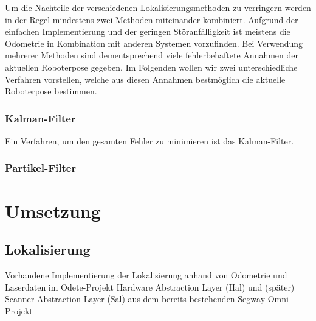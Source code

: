 Um die Nachteile der verschiedenen Lokalisierungsmethoden zu
 verringern werden in der Regel mindestens zwei Methoden miteinander
 kombiniert. Aufgrund der einfachen Implementierung und der geringen
 Störanfälligkeit ist meistens die Odometrie in Kombination mit
 anderen Systemen vorzufinden. Bei Verwendung mehrerer Methoden sind
 dementsprechend viele fehlerbehaftete Annahmen der aktuellen
 Roboterpose gegeben. Im Folgenden wollen wir zwei unterschiedliche
 Verfahren vorstellen, welche aus diesen Annahmen bestmöglich die
 aktuelle Roboterpose bestimmen.
 
\subsubsection{Kalman-Filter}
  Ein Verfahren, um den gesamten Fehler zu minimieren ist das
  Kalman-Filter.
\subsubsection{Partikel-Filter}
 
\section{Umsetzung}
\label{lokalisierung_umsetzung_sec}
\authorsection{\editordummy}
\subsection{Lokalisierung}
 
 Vorhandene
 Implementierung der Lokalisierung anhand von Odometrie und Laserdaten im Odete-Projekt
Hardware Abstraction Layer (Hal) und (später) Scanner Abstraction Layer (Sal)
aus dem bereits bestehenden Segway Omni Projekt

